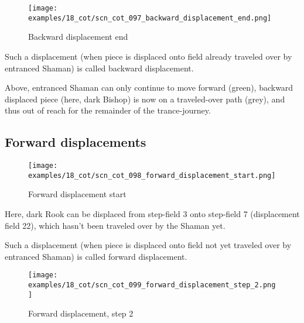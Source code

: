 \noindent
\begin{figure}[!h]
\texttt{[image: examples/18\_cot/scn\_cot\_097\_backward\_displacement\_end.png]}
\caption{Backward displacement end}
\label{fig:scn_cot_097_backward_displacement_end}
\end{figure}

Such a displacement (when piece is displaced onto field already traveled over
by entranced Shaman) is called backward displacement.

Above, entranced Shaman can only continue to move forward (green), backward
displaced piece (here, dark Bishop) is now on a traveled-over path (grey),
and thus out of reach for the remainder of the trance-journey.

\clearpage %

\subsection*{Forward displacements}
\label{sec:Conquest of Tlalocan/Trance-journey/Forward displacements}

\vspace*{-1.0\baselineskip}
\noindent
\begin{figure}[!h]
\texttt{[image: examples/18\_cot/scn\_cot\_098\_forward\_displacement\_start.png]}
\caption{Forward displacement start}
\label{fig:scn_cot_098_forward_displacement_start}
\end{figure}

Here, dark Rook can be displaced from step-field 3 onto step-field 7 (displacement
field 22), which hasn't been traveled over by the Shaman yet.

Such a displacement (when piece is displaced onto field not yet traveled over by
entranced Shaman) is called forward displacement.

\clearpage %

\noindent
\begin{figure}[!h]
\texttt{[image: examples/18\_cot/scn\_cot\_099\_forward\_displacement\_step\_2.png]}
\caption{Forward displacement, step 2}
\label{fig:scn_cot_099_forward_displacement_step_2}
\end{figure}

